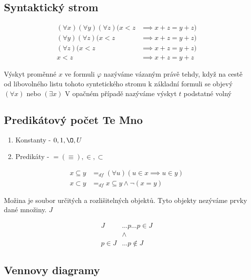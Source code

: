   \subsection*{Syntaktický strom}
  \begin{align*}
    (\forall x)(\forall y)(\forall z)(x<z  &\implies x+z=y+z)
    \\(\forall y)(\forall z)(x<z  &\implies x+z=y+z)
    \\(\forall z)(x<z  &\implies x+z=y+z)
    \\x<z  &\implies x+z=y+z
\end{align*}

\begin{description}
    \item Výskyt proměnné $x$ ve formuli $\varphi$ nazýváme vázaným právě tehdy, když na cestě od libovolného listu tohoto syntetického stromu k základní formuli se objevý $(\forall x)$ nebo $(\exists x)$ V opačném případě nazýváme výskyt $t$ podstatné volný
\end{description}

\subsection*{Predikátový počet Te Mno}
\begin{enumerate}
    \item Konstanty - $0,1, \O, U$
    \item Predikáty - $= (\equiv), \in, \subset$
\end{enumerate}
\begin{align*}
    x \subseteq y &=_{df} (\forall u ) (u \in x \implies u \in y)
    \\x \subset y &=_{df} x \subseteq y \land \neg(x=y)
\end{align*}
\begin{description}
    \item Možina je soubor určitých a rozlišitelných objektů. Tyto objekty nezýváme prvky dané množiny. $J$
\end{description}
\begin{align*}
    J &\dots p \dots p \in J \\
     &\land \\
     p \in J &\dots p \notin J
\end{align*}
\subsection*{Vennovy diagramy}

